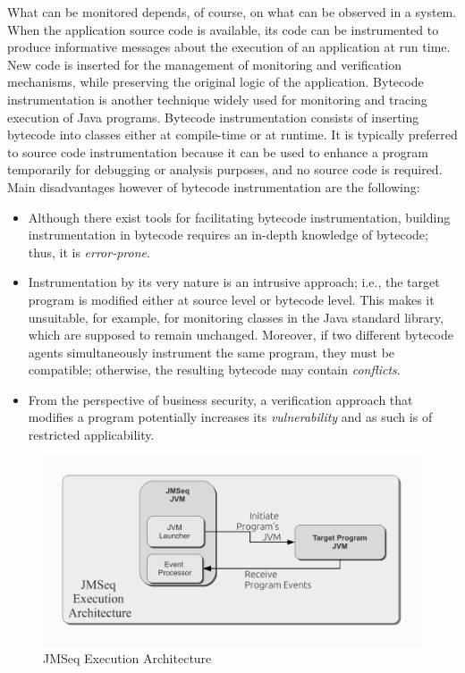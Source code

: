 What can be monitored depends, of course, on what can be observed in a system.
When the application source code is available, its code can be instrumented 
to produce informative messages about the execution of an application at run
time. New code is inserted  for the management of
monitoring and verification mechanisms, while preserving the original logic
of the application. 
Bytecode instrumentation is another technique widely used 
for monitoring and tracing execution of Java programs.
Bytecode instrumentation consists of inserting bytecode into classes either at compile-time or at runtime. 
It is typically preferred to source code instrumentation because it can be used to
enhance a program temporarily for debugging or
analysis purposes, and no source code is required.
Main disadvantages however of  bytecode
instrumentation are the following:

\begin{itemize}
\item
Although there exist tools for facilitating bytecode
instrumentation, building instrumentation in bytecode
requires an in-depth knowledge of bytecode; thus, it is \emph{error-prone}.
\item
Instrumentation by  its very nature is an intrusive approach; i.e., the target program is modified either at source level or bytecode level.
This makes it unsuitable, for example, for monitoring classes in the Java standard library, which are supposed to remain unchanged.
Moreover, if two different bytecode agents simultaneously instrument the same program,
they must be compatible; otherwise, the resulting bytecode may contain \emph{conflicts}.
\item
      From the perspective of business security, a verification approach that modifies a program potentially increases its \emph{vulnerability } and as such is of restricted applicability.
\end{itemize}

\begin{figure}[t]
\begin{center}
\includegraphics[scale=0.5]{images/arch-diagram-summary-exec}
\caption{JMSeq Execution Architecture}
\label{ch05:fig:arch-overview}
\end{center}
\end{figure}

